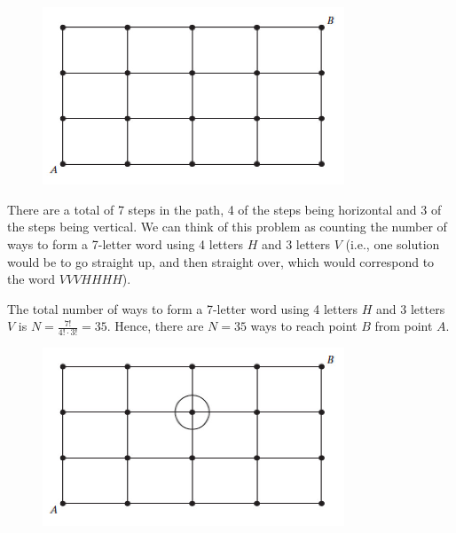 \documentclass[a4paper,12pt]{article}
\begin{document}
\begin{figure}[ht!]
\centering
\includegraphics[width=90mm]{RossFigure001.jpg}
\end{figure}

There are a total of 7 steps in the path, 4 of the steps being horizontal and 3 of the steps being vertical. We can think of this problem as counting the number of ways to form a 7-letter word using 4 letters $H$ and 3 letters $V$ (i.e., one solution would be to go straight up, and then straight over, which would correspond to the word $VVVHHHH$).

The total number of ways to form a 7-letter word using 4 letters $H$ and 3 letters $V$ is $N = \frac{7!}{4! \cdot 3!} = 35$. Hence, there are $N = 35$ ways to reach point $B$ from point $A$. 

\pagebreak
\vspace{4mm}

\begin{figure}[ht!]
\centering
\includegraphics[width=90mm]{RossFigure002.jpg}
\end{figure}
\end{document}
